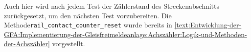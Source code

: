 Auch hier wird nach jedem Test der Zählerstand des Streckenabschnitts zurückgesetzt, um den nächsten Test vorzubereiten. Die Methode\newline\texttt{rail\_contact\_counter\_reset} wurde bereits in \autoref{text:Entwicklung-der-GFA:Implementierung-der-Gleisfreimeldeanlage:Achszähler:Logik-und-Methoden-der-Achszähler}  vorgestellt.